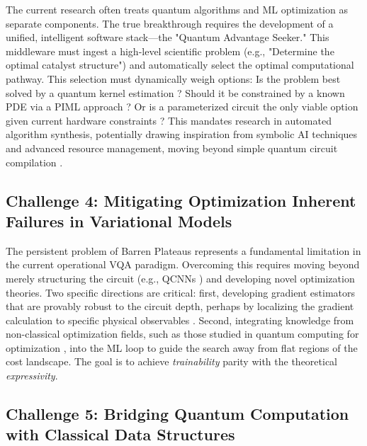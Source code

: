\documentclass{article}
\begin{document}
\label{sec:challenge_3\_designing\_truly\_robust\_and\_s}

The current research often treats quantum algorithms and ML optimization as separate components. The true breakthrough requires the development of a unified, intelligent software stack---the "Quantum Advantage Seeker." This middleware must ingest a high-level scientific problem (e.g., "Determine the optimal catalyst structure") and automatically select the optimal computational pathway. This selection must dynamically weigh options: Is the problem best solved by a quantum kernel estimation \cite{jager2023universal}? Should it be constrained by a known PDE via a PIML approach ? Or is a parameterized circuit the only viable option given current hardware constraints \cite{cerezo2021variational}? This mandates research in automated algorithm synthesis, potentially drawing inspiration from symbolic AI techniques and advanced resource management, moving beyond simple quantum circuit compilation \cite{araujo2021divideandconquer}.

\subsection{Challenge 4: Mitigating Optimization Inherent Failures in Variational Models}

\label{sec:challenge_4\_mitigating\_optimization\_inhe}

The persistent problem of Barren Plateaus represents a fundamental limitation in the current operational VQA paradigm. Overcoming this requires moving beyond merely structuring the circuit (e.g., QCNNs \cite{goto2021universal}) and developing novel optimization theories. Two specific directions are critical: first, developing gradient estimators that are provably robust to the circuit depth, perhaps by localizing the gradient calculation to specific physical observables \cite{kiani2022quantum}. Second, integrating knowledge from non-classical optimization fields, such as those studied in quantum computing for optimization \cite{sankar2024benchmarking}, into the ML loop to guide the search away from flat regions of the cost landscape. The goal is to achieve \textit{trainability} parity with the theoretical \textit{expressivity}.

\subsection{Challenge 5: Bridging Quantum Computation with Classical Data Structures}
\end{document}

